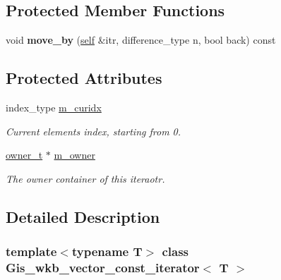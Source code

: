 \subsection*{Protected Member Functions}
\begin{DoxyCompactItemize}
\item 
\mbox{\label{classGis__wkb__vector__const__iterator_a0e375f8d23302baf3d60e5930b53a963}} 
void {\bfseries move\+\_\+by} (\mbox{\hyperlink{classGis__wkb__vector__const__iterator}{self}} \&itr, difference\+\_\+type n, bool back) const
\end{DoxyCompactItemize}
\subsection*{Protected Attributes}
\begin{DoxyCompactItemize}
\item 
\mbox{\label{classGis__wkb__vector__const__iterator_a820b6308e907bfd266f7d5ba782d5bcd}} 
index\+\_\+type \mbox{\hyperlink{classGis__wkb__vector__const__iterator_a820b6308e907bfd266f7d5ba782d5bcd}{m\+\_\+curidx}}
\begin{DoxyCompactList}\small\item\em Current element\textquotesingle{}s index, starting from 0. \end{DoxyCompactList}\item 
\mbox{\label{classGis__wkb__vector__const__iterator_a8612ccb1972eac5aa255e0d57a061c26}} 
\mbox{\hyperlink{classGis__wkb__vector}{owner\+\_\+t}} $\ast$ \mbox{\hyperlink{classGis__wkb__vector__const__iterator_a8612ccb1972eac5aa255e0d57a061c26}{m\+\_\+owner}}
\begin{DoxyCompactList}\small\item\em The owner container of this iteraotr. \end{DoxyCompactList}\end{DoxyCompactItemize}


\subsection{Detailed Description}
\subsubsection*{template$<$typename T$>$\newline
class Gis\+\_\+wkb\+\_\+vector\+\_\+const\+\_\+iterator$<$ T $>$}

